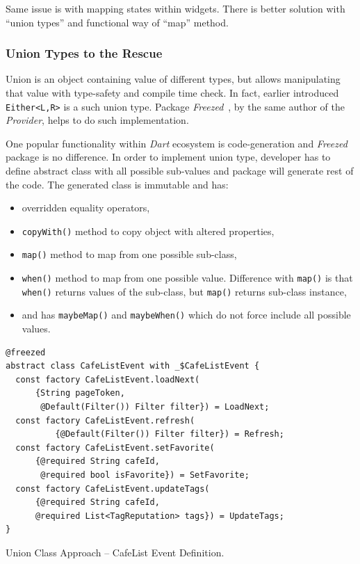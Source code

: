 Same issue is with mapping states within widgets. There is better solution with ``union types'' and functional way of ``map'' method.

\subsubsection{Union Types to the Rescue}
Union is an object containing value of different types, but allows manipulating that value with type-safety and compile time check. In fact, earlier introduced \verb|Either<L,R>| is a such union type. Package \textit{Freezed}~\cite{package-freezed}, by the same author of the \textit{Provider}, helps to do such implementation. 

One popular functionality within \textit{Dart} ecosystem is code-generation and \textit{Freezed} package is no difference. In order to implement union type, developer has to define abstract class with all possible sub-values and package will generate rest of the code. The generated class is immutable and has:

\begin{itemize}
    \item overridden equality operators,
    \item \verb|copyWith()| method to copy object with altered properties, 
    \item \verb|map()| method to map from one possible sub-class,
    \item \verb|when()| method to map from one possible value. Difference with \verb|map()|  is that \verb|when()| returns values of the sub-class, but \verb|map()| returns sub-class instance,
    \item and has \verb|maybeMap()| and \verb|maybeWhen()| which do not force include all possible values. 
\end{itemize}

\begin{listing}[ht]
\begin{verbatim}
@freezed
abstract class CafeListEvent with _$CafeListEvent {
  const factory CafeListEvent.loadNext(
      {String pageToken, 
       @Default(Filter()) Filter filter}) = LoadNext;
  const factory CafeListEvent.refresh(
          {@Default(Filter()) Filter filter}) = Refresh;
  const factory CafeListEvent.setFavorite(
      {@required String cafeId, 
       @required bool isFavorite}) = SetFavorite;
  const factory CafeListEvent.updateTags(
      {@required String cafeId,
      @required List<TagReputation> tags}) = UpdateTags;
}
\end{verbatim}
\caption{Union Class Approach -- CafeList Event Definition.}
\label{listing:ct-event-union}
\end{listing}

